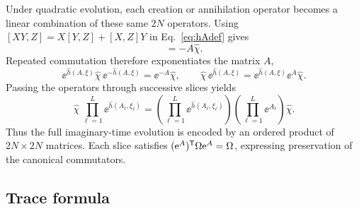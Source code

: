 Under quadratic evolution, each creation or annihilation operator becomes a linear combination of these same $2N$ operators. Using $[XY,Z]=X[Y,Z]+[X,Z]Y$ in Eq.~\eqref{eq:hAdef} gives
\begin{equation}
    [\hat h(A,\xi),\hat\chi]=-A\hat\chi.
    \label{eq:appendix_commutator}
\end{equation}
Repeated commutation therefore exponentiates the matrix $A$,
\begin{equation}
    \ee^{\hat h(A,\xi)}\hat\chi\,\ee^{-\hat h(A,\xi)}=\ee^{-A}\hat\chi,
    \qquad
    \hat\chi\,\ee^{\hat h(A,\xi)}=\ee^{\hat h(A,\xi)}\ee^A\hat\chi.
\end{equation}
Passing the operators through successive slices yields
\begin{equation}
    \hat\chi\,\prod_{\ell=1}^{L}\ee^{\hat h(A_\ell,\xi_\ell)}
    =
    \left(\prod_{\ell=1}^{L}\ee^{\hat h(A_\ell,\xi_\ell)}\right)
    \left(\prod_{\ell=1}^{L}\ee^{A_\ell}\right)\hat\chi.
    \label{eq:Mdef}
\end{equation}
Thus the full imaginary-time evolution is encoded by an ordered product of $2N\times2N$ matrices. Each slice satisfies $(\mathrm{e}^A)^{\mathsf{T}}\Omega\mathrm{e}^A=\Omega$, expressing preservation of the canonical commutators.

\subsection{Trace formula}
\label{app:trace_paired}

